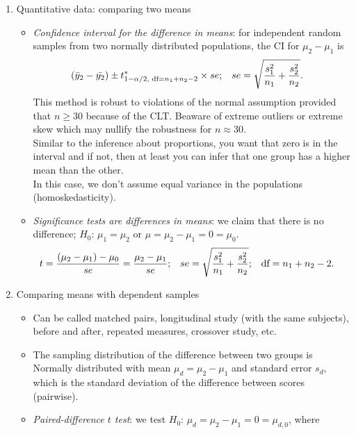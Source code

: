 \begin{enumerate}[label=\textbf{\S~\arabic*}, ref=\S~\arabic*]
\begin{enumerate}[label=\textbf{\S~7.\arabic*}, ref=\S~7.\arabic*]
        \clearpage
        \item Quantitative data: comparing two means
        \begin{itemize}
            \item \textit{Confidence interval for the difference in means}: for independent random samples from two normally distributed populations, the CI for $\mu_2 - \mu_1$ is
            \begin{align*}
                \left( \bar{y}_2 - \bar{y_2}\right) \pm t^*_{1 - \alpha/2, \text{ df}=n_1+n_2-2} \times se; && se &= \sqrt{\frac{s_1^2}{n_1} + \frac{s_2^2}{n_2}}.
            \end{align*}
            This method is robust to violations of the normal assumption provided that $n\geq 30$ because of the CLT. Beaware of extreme outliers or extreme skew which may nullify the robustness for $n\approx 30$.
            \\
            Similar to the inference about proportions, you want that zero is in the interval and if not, then at least you can infer that one group has a higher mean than the other.
            \\
            In this case, we don't assume equal variance in the populations (homoskedasticity).
            \item \textit{Significance tests are differences in means}: we claim that there is no difference; $H_0$: $\mu_1 = \mu_2$ or $\mu = \mu_2 - \mu_1 = 0 = \mu_0$.
            \begin{align*}
                t &= \frac{\left( \mu_2 - \mu_1\right) - \mu_0}{se} = \frac{\mu_2 - \mu_1}{se}; & se &= \sqrt{\frac{s_1^2}{n_1} + \frac{s_2^2}{n_2}}; & \text{df} &= n_1 + n_2 - 2.
            \end{align*}
        \end{itemize}
        \item Comparing means with dependent samples
        \begin{itemize}
            \item Can be called matched pairs, longitudinal study (with the same subjects), before and after, repeated measures, crossover study, etc.
            \item The sampling distribution of the difference between two groups is Normally distributed with mean $\mu_d = \mu_2 - \mu_1$ and standard error $s_d$, which is the standard deviation of the difference between scores (pairwise).
            \item \textit{Paired-difference $t$ test}: we test $H_0$: $\mu_d = \mu_2 - \mu_1 = 0 = \mu_{d,0}$, where

\end{itemize}
\end{enumerate}
\end{enumerate}
